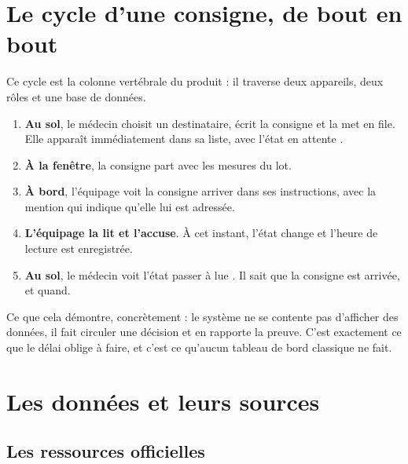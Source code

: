 \documentclass[11pt,a4paper]{article}
\let\sectionorig\section
\renewcommand{\section}{\Needspace{5\baselineskip}\sectionorig}
\begin{document}
\section{Le cycle d'une consigne, de bout en bout}

Ce cycle est la colonne vert\'ebrale du produit : il traverse deux appareils, deux r\^oles
et une base de donn\'ees.

\begin{enumerate}
  \item \textbf{Au sol}, le m\'edecin choisit un destinataire, \'ecrit la consigne et la met en file.
        Elle appara\^it imm\'ediatement dans sa liste, avec l'\'etat \og en attente \fg{}.
  \item \textbf{\`A la fen\^etre}, la consigne part avec les mesures du lot.
  \item \textbf{\`A bord}, l'\'equipage voit la consigne arriver dans ses instructions, avec la mention
        qui indique qu'elle lui est adress\'ee.
  \item \textbf{L'\'equipage la lit et l'accuse}. \`A cet instant, l'\'etat change et l'heure de lecture
        est enregistr\'ee.
  \item \textbf{Au sol}, le m\'edecin voit l'\'etat passer \`a \og lue \fg{}. Il sait que la consigne
        est arriv\'ee, et quand.
\end{enumerate}

Ce que cela d\'emontre, concr\`etement : le syst\`eme ne se contente pas d'afficher des donn\'ees, il
fait circuler une d\'ecision et en rapporte la preuve. C'est exactement ce que le d\'elai oblige \`a
faire, et c'est ce qu'aucun tableau de bord classique ne fait.

\section{Les donn\'ees et leurs sources}

\subsection{Les ressources officielles}
\end{document}

